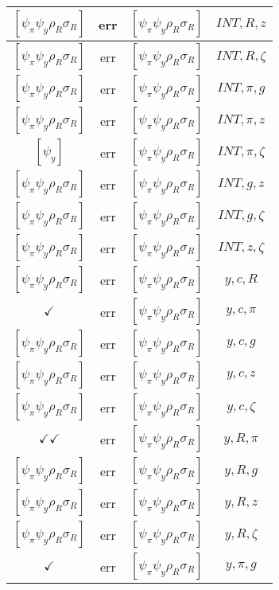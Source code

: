 \documentclass[a4paper,10pt]{article}
\begin{document}
\begin{longtable}{|c|c|c|c|}
\hline
$[\psi_\pi \psi_y \rho_R \sigma_R ]$ & err & $[\psi_\pi \psi_y \rho_R \sigma_R ]$ & ${INT},{R},{z}$ \\
\hline
$[\psi_\pi \psi_y \rho_R \sigma_R ]$ & err & $[\psi_\pi \psi_y \rho_R \sigma_R ]$ & ${INT},{R},{\zeta}$ \\
\hline
$[\psi_\pi \psi_y \rho_R \sigma_R ]$ & err & $[\psi_\pi \psi_y \rho_R \sigma_R ]$ & ${INT},{\pi},{g}$ \\
\hline
$[\psi_\pi \psi_y \rho_R \sigma_R ]$ & err & $[\psi_\pi \psi_y \rho_R \sigma_R ]$ & ${INT},{\pi},{z}$ \\
\hline
$[\psi_y ]$ & err & $[\psi_\pi \psi_y \rho_R \sigma_R ]$ & ${INT},{\pi},{\zeta}$ \\
\hline
$[\psi_\pi \psi_y \rho_R \sigma_R ]$ & err & $[\psi_\pi \psi_y \rho_R \sigma_R ]$ & ${INT},{g},{z}$ \\
\hline
$[\psi_\pi \psi_y \rho_R \sigma_R ]$ & err & $[\psi_\pi \psi_y \rho_R \sigma_R ]$ & ${INT},{g},{\zeta}$ \\
\hline
$[\psi_\pi \psi_y \rho_R \sigma_R ]$ & err & $[\psi_\pi \psi_y \rho_R \sigma_R ]$ & ${INT},{z},{\zeta}$ \\
\hline
$[\psi_\pi \psi_y \rho_R \sigma_R ]$ & err & $[\psi_\pi \psi_y \rho_R \sigma_R ]$ & ${y},{c},{R}$ \\
\hline
$\checkmark$ & err & $[\psi_\pi \psi_y \rho_R \sigma_R ]$ & ${y},{c},{\pi}$ \\
\hline
$[\psi_\pi \psi_y \rho_R \sigma_R ]$ & err & $[\psi_\pi \psi_y \rho_R \sigma_R ]$ & ${y},{c},{g}$ \\
\hline
$[\psi_\pi \psi_y \rho_R \sigma_R ]$ & err & $[\psi_\pi \psi_y \rho_R \sigma_R ]$ & ${y},{c},{z}$ \\
\hline
$[\psi_\pi \psi_y \rho_R \sigma_R ]$ & err & $[\psi_\pi \psi_y \rho_R \sigma_R ]$ & ${y},{c},{\zeta}$ \\
\hline
$\checkmark\checkmark$ & err & $[\psi_\pi \psi_y \rho_R \sigma_R ]$ & ${y},{R},{\pi}$ \\
\hline
$[\psi_\pi \psi_y \rho_R \sigma_R ]$ & err & $[\psi_\pi \psi_y \rho_R \sigma_R ]$ & ${y},{R},{g}$ \\
\hline
$[\psi_\pi \psi_y \rho_R \sigma_R ]$ & err & $[\psi_\pi \psi_y \rho_R \sigma_R ]$ & ${y},{R},{z}$ \\
\hline
$[\psi_\pi \psi_y \rho_R \sigma_R ]$ & err & $[\psi_\pi \psi_y \rho_R \sigma_R ]$ & ${y},{R},{\zeta}$ \\
\hline
$\checkmark$ & err & $[\psi_\pi \psi_y \rho_R \sigma_R ]$ & ${y},{\pi},{g}$ \\

\end{longtable}
\end{document}
